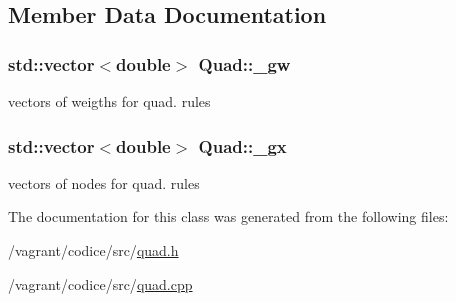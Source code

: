 \subsection{Member Data Documentation}
\hypertarget{classQuad_a44593010da364867e14db57c55b30c85}{
\subsubsection[{\-\_\-gw}]{\setlength{\rightskip}{0pt plus 5cm}std\-::vector$<$double$>$ Quad\-::\-\_\-gw\hspace{0.3cm}{\ttfamily [protected]}}}\label{classQuad_a44593010da364867e14db57c55b30c85}
vectors of weigths for quad. rules \hypertarget{classQuad_a8c716829e519994befe42507113a694c}{
\subsubsection[{\-\_\-gx}]{\setlength{\rightskip}{0pt plus 5cm}std\-::vector$<$double$>$ Quad\-::\-\_\-gx\hspace{0.3cm}{\ttfamily [protected]}}}\label{classQuad_a8c716829e519994befe42507113a694c}
vectors of nodes for quad. rules 

The documentation for this class was generated from the following files\-:\begin{DoxyCompactItemize}
\item 
/vagrant/codice/src/\hyperlink{quad_8h}{quad.\-h}\item 
/vagrant/codice/src/\hyperlink{quad_8cpp}{quad.\-cpp}\end{DoxyCompactItemize}
